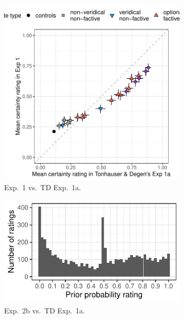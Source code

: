 \documentclass[11pt,fleqn]{article}
\newcommand{\6}{\mbox{$[\hspace*{-.6mm}[$}}
\newcommand{\9}{\mbox{$]\hspace*{-.6mm}]$}}
\begin{document}
\begin{figure}[h!]
\begin{subfigure}{.33\textwidth}
\includegraphics[width=\textwidth]{../../results/exp4/graphs/projection-comparison}
\caption{Exp.~1 vs.\ TD Exp.~1a.}
\label{f-projcomp1}
\end{subfigure}
\begin{subfigure}{.33\textwidth}
\includegraphics[width=\textwidth]{../../results/exp4/graphs/bunching-prior}
\caption{Exp.~2b vs.\ TD Exp.~1a.}
\label{f-projcomp2}
\end{subfigure}
\begin{subfigure}{.33\textwidth}

\end{subfigure}
\end{figure}
\end{document}
